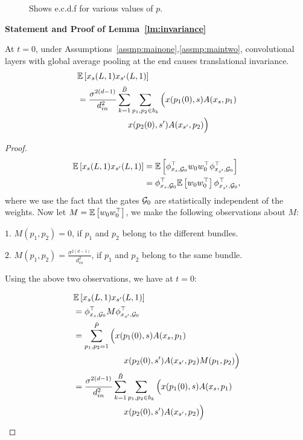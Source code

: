 {\begin{figure}[h]
{\begin{tabular}{cc}
\end{tabular}
}
\caption{Shows e.c.d.f for various values of $p$.}
\label{fig:peff}
\end{figure}}


\textbf{Statement and Proof of Lemma~\ref{lm:invariance}}
\begin{lemma}
At $t=0$, under Assumptions~\ref{assmp:mainone},\ref{assmp:maintwo}, convolutional layers with global average pooling at the end causes translational invariance.
\begin{align*}
&\mathbb{E}\left[x_s(L,1)x_{s'}(L,1)\right]\\&=\frac{\sigma^{2(d-1)}}{d^2_{in}}\sum_{k=1}^{\hat{B}} \sum_{p_1,p_2\in b_k}  \Big( x(p_1(0),s) A(x_s,p_1)\\
&\quad\quad \quad\quad \quad\quad x(p_2(0),s') A(x_{s'},p_2) \Big)
\end{align*}
\end{lemma}

\begin{proof}
\begin{align*}
\mathbb{E}\left[x_s(L,1)x_{s'}(L,1)\right]&=\mathbb{E}\left[\phi^\top_{x_s,\mathcal{G}_0} w_0w_0^\top \phi^\top_{x_{s'},\mathcal{G}_0}\right]\\
&=\phi^\top_{x_s,\mathcal{G}_0}\mathbb{E}\left[ w_0 w_0^\top\right] \phi^\top_{x_{s'},\mathcal{G}_0},
\end{align*}
where we use the fact that the gates $\mathcal{G}_0$ are statistically independent of the weights. Now let $M=\mathbb{E}\left[ w_0 w_0^\top\right]$, we make the following observations about $M$:

$1.$ $M(p_1,p_2)=0$, if $p_1$ and $p_2$ belong to the different bundles.

$2.$ $M(p_1,p_2)=\frac{\sigma^{2(d-1)}}{d^2_{in}}$, if $p_1$ and $p_2$ belong to the same bundle.

Using the above two observations, we have at  $t=0$:

\begin{align*}
&\mathbb{E}\left[x_s(L,1)x_{s'}(L,1)\right]\\&=\phi^\top_{x_s,\mathcal{G}_0} M \phi^\top_{x_{s'},\mathcal{G}_0}\\
&=\sum_{p_1,p_2=1}^{\hat{P}} \Big(x(p_1(0),s) A(x_s,p_1) \\
&\quad\quad \quad\quad \quad\quad x(p_2(0),s') A(x_{s'},p_2) M(p_1,p_2)\Big)\\
&=\frac{\sigma^{2(d-1)}}{d^2_{in}}\sum_{k=1}^{\hat{B}} \sum_{p_1,p_2\in b_k}  \Big( x(p_1(0),s) A(x_s,p_1)\\
&\quad\quad \quad\quad \quad\quad x(p_2(0),s') A(x_{s'},p_2) \Big)
\end{align*}
\end{proof}


